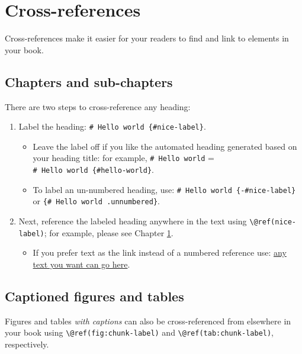 \documentclass[
]{book}
\providecommand{\tightlist}{%
  \setlength{\itemsep}{0pt}\setlength{\parskip}{0pt}}
\theoremstyle{definition}
\theoremstyle{definition}
\theoremstyle{definition}
\theoremstyle{definition}
\theoremstyle{remark}
\begin{document}
\chapter{Cross-references}\label{cross}

Cross-references make it easier for your readers to find and link to elements in your book.

\section{Chapters and sub-chapters}\label{chapters-and-sub-chapters}

There are two steps to cross-reference any heading:

\begin{enumerate}
\def\labelenumi{\arabic{enumi}.}
\tightlist
\item
  Label the heading: \texttt{\#\ Hello\ world\ \{\#nice-label\}}.

  \begin{itemize}
  \tightlist
  \item
    Leave the label off if you like the automated heading generated based on your heading title: for example, \texttt{\#\ Hello\ world} = \texttt{\#\ Hello\ world\ \{\#hello-world\}}.
  \item
    To label an un-numbered heading, use: \texttt{\#\ Hello\ world\ \{-\#nice-label\}} or \texttt{\{\#\ Hello\ world\ .unnumbered\}}.
  \end{itemize}
\item
  Next, reference the labeled heading anywhere in the text using \texttt{\textbackslash{}@ref(nice-label)}; for example, please see Chapter \ref{cross}.

  \begin{itemize}
  \tightlist
  \item
    If you prefer text as the link instead of a numbered reference use: \hyperref[cross]{any text you want can go here}.
  \end{itemize}
\end{enumerate}

\section{Captioned figures and tables}\label{captioned-figures-and-tables}

Figures and tables \emph{with captions} can also be cross-referenced from elsewhere in your book using \texttt{\textbackslash{}@ref(fig:chunk-label)} and \texttt{\textbackslash{}@ref(tab:chunk-label)}, respectively.
\end{document}
